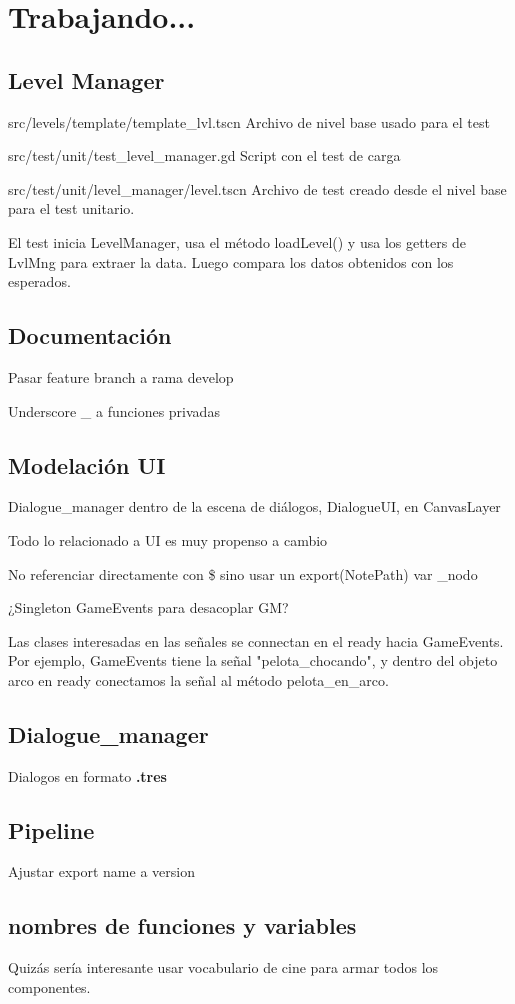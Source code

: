 
\section{Trabajando...}\label{Trabajando}

\subsection{Level Manager}

src/levels/template/template\_lvl.tscn Archivo de nivel base usado para el test

src/test/unit/test\_level\_manager.gd Script con el test de carga

src/test/unit/level\_manager/level.tscn Archivo de test creado desde el nivel base para el test unitario.

El test inicia LevelManager, usa el método loadLevel() y usa los getters de LvlMng para extraer la data. Luego compara los datos obtenidos con los esperados.


\subsection{Documentación}

Pasar feature branch a rama develop

Underscore \_ a funciones privadas

\subsection{Modelación UI}

Dialogue\_manager dentro de la escena de diálogos, DialogueUI, en CanvasLayer

Todo lo relacionado a UI es muy propenso a cambio

No referenciar directamente con \$ sino usar un export(NotePath) var \_nodo

¿Singleton GameEvents para desacoplar GM?

Las clases interesadas en las señales se connectan en el ready hacia GameEvents. Por ejemplo, GameEvents tiene la señal "pelota\_chocando", y dentro del objeto arco en ready conectamos la señal al método pelota\_en\_arco. 

\subsection{Dialogue\_manager}

Dialogos en formato \textbf{.tres}

\subsection{Pipeline}

Ajustar export name a version

\subsection{nombres de funciones y variables}

Quizás sería interesante usar vocabulario de cine para armar todos los componentes.
